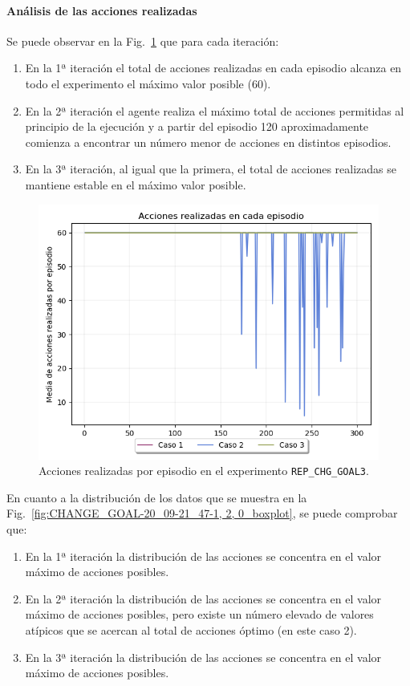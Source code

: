 \paragraph{Análisis de las acciones realizadas}

Se puede observar en la Fig.~\ref{fig:CHANGE_GOAL-20_09-21_47-1, 2, 0_acciones} que para cada iteración: 
\begin{enumerate}
    \item En la 1ª iteración el total de acciones realizadas en cada episodio alcanza en todo el experimento el máximo valor posible (60).
    \item En la 2ª iteración el agente realiza el máximo total de acciones permitidas al principio de la ejecución y a partir del episodio 120 aproximadamente comienza a encontrar un número menor de acciones en distintos episodios. 
    \item En la 3ª iteración, al igual que la primera, el total de acciones realizadas se mantiene estable en el máximo valor posible.
\end{enumerate}

 \begin{figure}
    \centering
    \includegraphics[scale=0.4]{cap5_experimentacion/images/CHANGE_GOAL-20_09-21_47-1, 2, 0_acciones.png}
    \caption{Acciones realizadas por episodio en el experimento \texttt{REP\_CHG\_GOAL3}.}
    \label{fig:CHANGE_GOAL-20_09-21_47-1, 2, 0_acciones}
\end{figure}

En cuanto a la distribución de los datos que se muestra en la Fig.~\ref{fig:CHANGE_GOAL-20_09-21_47-1, 2, 0_boxplot}, se puede comprobar que:
\begin{enumerate}
    \item En la 1ª iteración la distribución de las acciones se concentra en el valor máximo de acciones posibles. 
    \item En la 2ª iteración la distribución de las acciones se concentra en el valor máximo de acciones posibles, pero existe un número elevado de valores atípicos que se acercan al total de acciones óptimo (en este caso 2).
    \item En la 3ª iteración la distribución de las acciones se concentra en el valor máximo de acciones posibles.  
\end{enumerate}

